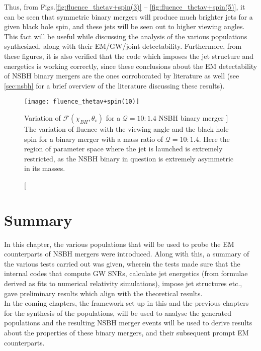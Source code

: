     Thus, from Figs.\ref{fig:fluence_thetav+spin(3)} --
    \ref{fig:fluence_thetav+spin(5)}, it can be seen that symmetric binary mergers will
    produce much brighter jets for a given black hole spin, and these jets will be seen
    out to higher viewing angles. This fact will be useful while discussing the analysis
    of the various populations synthesized, along with their EM/GW/joint
    detectability.  Furthermore, from these figures, it is also verified that the code
    which imposes the jet structure and energetics is working correctly, since these
    conclusions about the EM detectability of NSBH binary mergers are the ones
    corroborated by literature as well (see \ref{sec:nsbh} for a brief overview of the
    literature discussing these results).

    \begin{figure}[ht]
        \centering
        \texttt{[image: fluence\_thetav+spin(10)]}
        \caption
        [
            Variation of $\mathcal{F}(\chi_{BH}, \theta_{v})$ for a $\mathcal{Q}=10:1.4$
            NSBH binary merger
        ]
        {
            The variation of fluence with the viewing angle and the black hole spin for
            a binary merger with a mass ratio of $\mathcal{Q}=10:1.4$. Here the region
            of parameter space where the jet is launched is extremely restricted, as the
            NSBH binary in question is extremely asymmetric in its masses.
        }
        \label{fig:fluence_thetav+spin(10)}
    \end{figure}

\section{Summary}

    In this chapter, the various populations that will be used to probe the EM
    counterparts of NSBH mergers were introduced. Along with this, a summary of the
    various tests carried out was given, wherein the tests made sure that the internal
    codes that compute GW SNRs, calculate jet energetics (from formulae derived as fits
    to numerical relativity simulations), impose jet structures etc., gave preliminary
    results which align with the theoretical results.\\
    In the coming chapters, the framework set up in this and the previous chapters for
    the synthesis of the populations, will be used to analyse the generated populations
    and the resulting NSBH merger events will be used to derive results about the
    properties of these binary mergers, and their subsequent prompt EM counterparts.
